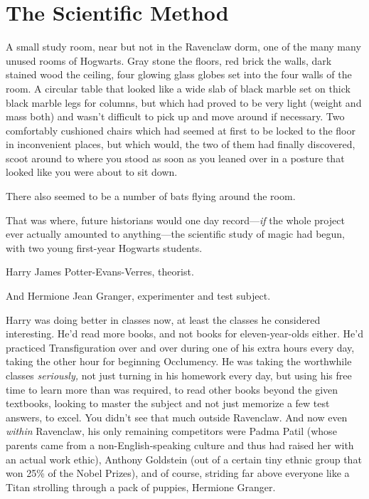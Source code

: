 \chapter{The Scientific Method}

\lettrine{A}{} small study room, near but not in the Ravenclaw dorm, one of the many many
unused rooms of Hogwarts. Gray stone the floors, red brick the walls, dark
stained wood the ceiling, four glowing glass globes set into the four walls of
the room. A circular table that looked like a wide slab of black marble set on
thick black marble legs for columns, but which had proved to be very light
(weight and mass both) and wasn't difficult to pick up and move around if
necessary. Two comfortably cushioned chairs which had seemed at first to be
locked to the floor in inconvenient places, but which would, the two of them
had finally discovered, scoot around to where you stood as soon as you leaned
over in a posture that looked like you were about to sit down.

There also seemed to be a number of bats flying around the room.

That was where, future historians would one day record---\emph{if} the whole
project ever actually amounted to anything---the scientific study of magic had
begun, with two young first-year Hogwarts students.

Harry James Potter-Evans-Verres, theorist.

And Hermione Jean Granger, experimenter and test subject.

Harry was doing better in classes now, at least the classes he considered
interesting. He'd read more books, and not books for eleven-year-olds either.
He'd practiced Transfiguration over and over during one of his extra hours
every day, taking the other hour for beginning Occlumency. He was taking the
worthwhile classes \emph{seriously,} not just turning in his homework every
day, but using his free time to learn more than was required, to read other
books beyond the given textbooks, looking to master the subject and not just
memorize a few test answers, to excel. You didn't see that much outside
Ravenclaw. And now even \emph{within} Ravenclaw, his only remaining competitors
were Padma Patil (whose parents came from a non-English-speaking culture and
thus had raised her with an actual work ethic), Anthony Goldstein (out of a
certain tiny ethnic group that won 25\% of the Nobel Prizes), and of course,
striding far above everyone like a Titan strolling through a pack of puppies,
Hermione Granger.

